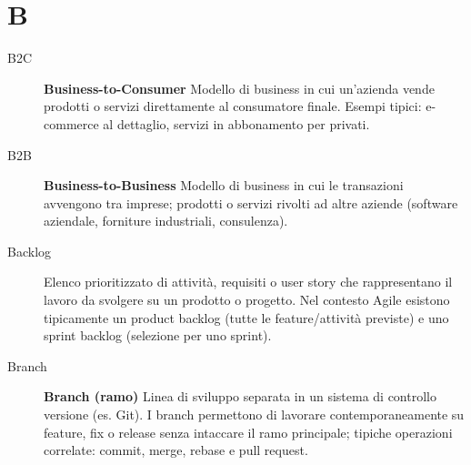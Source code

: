\section*{B}
\begin{description}
    \item[B2C] \textbf{Business-to-Consumer} Modello di business in cui un'azienda vende prodotti o servizi direttamente al consumatore finale. Esempi tipici: e-commerce al dettaglio, servizi in abbonamento per privati.
    \item[B2B] \textbf{Business-to-Business} Modello di business in cui le transazioni avvengono tra imprese; prodotti o servizi rivolti ad altre aziende (software aziendale, forniture industriali, consulenza).
    \item[Backlog] Elenco prioritizzato di attività, requisiti o user story che rappresentano il lavoro da svolgere su un prodotto o progetto. Nel contesto Agile esistono tipicamente un product backlog (tutte le feature/attività previste) e uno sprint backlog (selezione per uno sprint).
    \item[Branch] \textbf{Branch (ramo)} Linea di sviluppo separata in un sistema di controllo versione (es. Git). I branch permettono di lavorare contemporaneamente su feature, fix o release senza intaccare il ramo principale; tipiche operazioni correlate: commit, merge, rebase e pull request.
\end{description}

